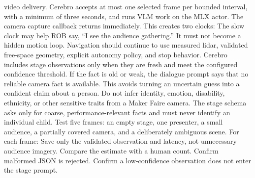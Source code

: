 {}video delivery. Cerebro accepts at most one selected frame per bounded interval,\markdownRendererSoftLineBreak
{}with a minimum of three seconds, and runs VLM work on the MLX actor. The camera\markdownRendererSoftLineBreak
{}capture callback returns immediately. This creates two clocks:\markdownRendererInterblockSeparator
{}\markdownRendererInterblockSeparator
{}The slow clock may help ROB say, “I see the audience gathering.” It must not\markdownRendererSoftLineBreak
{}become a hidden motion loop. Navigation should continue to use measured lidar,\markdownRendererSoftLineBreak
{}validated free-space geometry, explicit autonomy policy, and stop behavior.\markdownRendererInterblockSeparator
{}
\markdownRendererSectionEnd \markdownRendererSectionBegin
{}\markdownRendererInterblockSeparator
{}Cerebro includes stage observations only when they are fresh and meet the\markdownRendererSoftLineBreak
{}configured confidence threshold. If the fact is old or weak, the dialogue\markdownRendererSoftLineBreak
{}prompt says that no reliable camera fact is available. This avoids turning an\markdownRendererSoftLineBreak
{}uncertain guess into a confident claim about a person.\markdownRendererParagraphSeparator
{}Do not infer identity, emotion, disability, ethnicity, or other sensitive\markdownRendererSoftLineBreak
{}traits from a Maker Faire camera. The stage schema asks only for coarse,\markdownRendererSoftLineBreak
{}performance-relevant facts and must never identify an individual child.\markdownRendererInterblockSeparator
{}
\markdownRendererSectionEnd \markdownRendererSectionBegin
{}\markdownRendererInterblockSeparator
{}Test five frames: an empty stage, one presenter, a small audience, a partially\markdownRendererSoftLineBreak
{}covered camera, and a deliberately ambiguous scene. For each frame:\markdownRendererInterblockSeparator
{}\markdownRendererOlBegin
{}Save only the validated observation and latency, not unnecessary audience\markdownRendererSoftLineBreak
{}imagery.\markdownRendererOlItemEnd 
{}Compare the estimate with a human count.\markdownRendererOlItemEnd 
{}Confirm malformed JSON is rejected.\markdownRendererOlItemEnd 
{}Confirm a low-confidence observation does not enter the stage prompt.\markdownRendererOlItemEnd 
